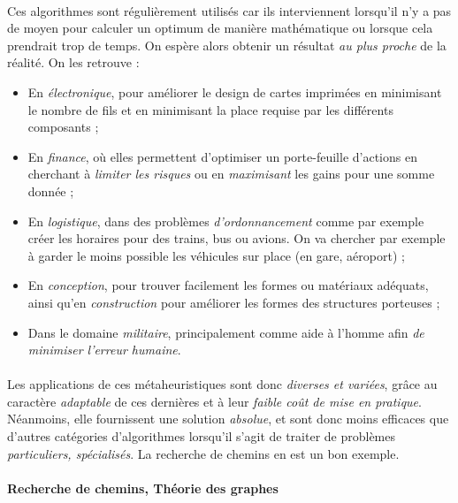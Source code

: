 \paragraph{} Ces algorithmes sont régulièrement utilisés car ils interviennent lorsqu'il n'y a pas de moyen pour 
calculer un optimum de manière mathématique ou lorsque cela prendrait trop de temps. On espère alors obtenir un
résultat \emph{au plus proche} de la réalité. On les retrouve :
\begin{itemize}
    \item En \emph{électronique}, pour améliorer le design de cartes imprimées en minimisant le nombre de fils et 
    en minimisant la place requise par les différents composants ;
    \item En \emph{finance}, où elles permettent d'optimiser un porte-feuille d'actions en cherchant à \emph{limiter
    les risques} ou en \emph{maximisant} les gains pour une somme donnée ;
    \item En \emph{logistique}, dans des problèmes \emph{d'ordonnancement} comme par exemple créer les horaires pour
    des trains, bus ou avions. On va chercher par exemple à garder le moins possible les véhicules sur place (en gare, 
    aéroport) ;
    \item En \emph{conception}, pour trouver facilement les formes ou matériaux adéquats, ainsi qu'en \emph{construction}
    pour améliorer les formes des structures porteuses ;
    \item Dans le domaine \emph{militaire}, principalement comme aide à l'homme afin \emph{de minimiser l'erreur
    humaine}. 
\end{itemize}

\paragraph{} Les applications de ces métaheuristiques sont donc \emph{diverses et variées}, grâce au caractère \emph{
adaptable} de ces dernières et à leur \emph{faible coût de mise en pratique}. Néanmoins, elle fournissent une
solution \emph{absolue}, et sont donc moins efficaces que d'autres catégories d'algorithmes lorsqu'il s'agit de traiter
de problèmes \emph{particuliers, spécialisés}. La recherche de chemins en est un bon exemple. 

\paragraph{Recherche de chemins, Théorie des graphes}

